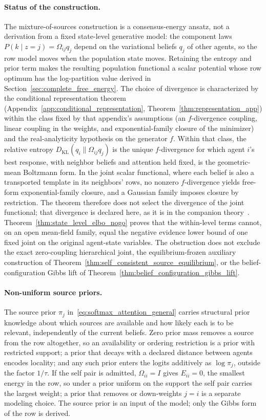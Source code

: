 \paragraph{Status of the construction.} The mixture-of-sources construction is a consensus-energy ansatz, not a derivation from a fixed state-level generative model: the component laws $P(k \mid z{=}j) = \Omega_{ij}q_j$ depend on the variational beliefs $q_j$ of other agents, so the row model moves when the population state moves. Retaining the entropy and prior term makes the resulting population functional a scalar potential whose row optimum has the log-partition value derived in Section~\ref{sec:complete_free_energy}. The choice of divergence is characterized by the conditional representation theorem (Appendix~\ref{app:conditional_representation}, Theorem~\ref{thm:representation_app}) within the class fixed by that appendix's assumptions (an $f$-divergence coupling, linear coupling in the weights, and exponential-family closure of the minimizer) and the real-analyticity hypothesis on the generator $f$. Within that class, the relative entropy $D_{\mathrm{KL}}(q_i\|\Omega_{ij}q_j)$ is the unique $f$-divergence for which agent $i$'s best response, with neighbor beliefs and attention held fixed, is the geometric-mean Boltzmann form. In the joint scalar functional, where each belief is also a transported template in its neighbors' rows, no nonzero $f$-divergence yields free-form exponential-family closure, and a Gaussian family imposes closure by restriction. The theorem therefore does not select the divergence of the joint functional; that divergence is declared here, as it is in the companion theory~\cite[Chs.~6 and~12]{DennisGaugeVFE2026}. Theorem~\ref{thm:state_level_elbo_nogo} proves that the within-level terms cannot, on an open mean-field family, equal the negative evidence lower bound of one fixed joint on the original agent-state variables. The obstruction does not exclude the exact zero-coupling hierarchical joint, the equilibrium-frozen auxiliary construction of Theorem~\ref{thm:self_consistent_source_equilibrium}, or the belief-configuration Gibbs lift of Theorem~\ref{thm:belief_configuration_gibbs_lift}.

\paragraph{Non-uniform source priors.} The source prior $\pi_j$ in~\eqref{eq:softmax_attention_general} carries structural prior knowledge about which sources are available and how likely each is to be relevant, independently of the current beliefs. Zero prior mass removes a source from the row altogether, so an availability or ordering restriction is a prior with restricted support; a prior that decays with a declared distance between agents encodes locality; and any such prior enters the logits additively as $\log\pi_j$, outside the factor $1/\tau$. If the self pair is admitted, $\Omega_{ii} = I$ gives $E_{ii} = 0$, the smallest energy in the row, so under a prior uniform on the support the self pair carries the largest weight; a prior that removes or down-weights $j = i$ is a separate modeling choice. The source prior is an input of the model; only the Gibbs form of the row is derived.

